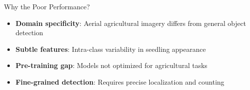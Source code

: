 \documentclass[aspectratio=43]{beamer}
\begin{document}
\begin{frame}
    \begin{block}{Why the Poor Performance?}
        \small
        \begin{itemize}
            \item \textbf{Domain specificity}: Aerial agricultural imagery differs from general object detection
            \item \textbf{Subtle features}: Intra-class variability in seedling appearance
            \item \textbf{Pre-training gap}: Models not optimized for agricultural tasks
            \item \textbf{Fine-grained detection}: Requires precise localization and counting
        \end{itemize}
    \end{block}
\end{frame}
\end{document}
